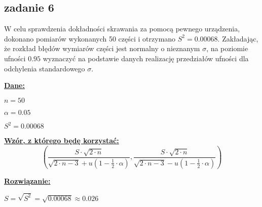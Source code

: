 \subsection{zadanie 6}
W celu sprawdzenia dokładności skrawania za pomocą pewnego urządzenia, dokonano pomiarów wykonanych 50 części i otrzymano $S^2=0.00068$. Zakładając, że rozkład błędów wymiarów części jest normalny o nieznanym $\sigma$, na poziomie ufności $0.95$ wyznaczyć na podstawie danych realizację przedziałów ufności dla odchylenia standardowego $\sigma$. 
\newline

\textbf{\underline{Dane:}}

$n = 50$ 

$\alpha = 0.05$ 

$S^{2} = 0.00068$

\textbf{\underline{Wzór, z którego będę korzystać:}}
$$
\left(
\frac{S \cdot \sqrt{2 \cdot n}}{\sqrt{2 \cdot n-3}+u(1-\frac{1}{2} \cdot \alpha)},
\frac{S \cdot \sqrt{2 \cdot n}}{\sqrt{2 \cdot n-3}-u(1-\frac{1}{2} \cdot \alpha)}
\right)
$$

\textbf{\underline{Rozwiązanie:}}

$S = \sqrt{S^{2}} = \sqrt{0.00068} \approx 0.026$

